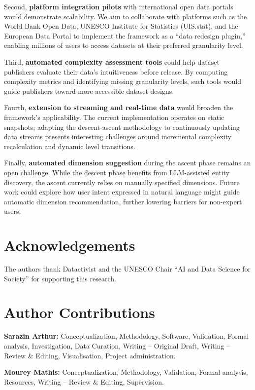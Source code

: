 \documentclass[12pt,a4paper]{article}
\begin{document}
Second, \textbf{platform integration pilots} with international open data portals would demonstrate scalability. We aim to collaborate with platforms such as the World Bank Open Data, UNESCO Institute for Statistics (UIS.stat), and the European Data Portal to implement the framework as a ``data redesign plugin,'' enabling millions of users to access datasets at their preferred granularity level.

Third, \textbf{automated complexity assessment tools} could help dataset publishers evaluate their data's intuitiveness before release. By computing complexity metrics and identifying missing granularity levels, such tools would guide publishers toward more accessible dataset designs.

Fourth, \textbf{extension to streaming and real-time data} would broaden the framework's applicability. The current implementation operates on static snapshots; adapting the descent-ascent methodology to continuously updating data streams presents interesting challenges around incremental complexity recalculation and dynamic level transitions.

Finally, \textbf{automated dimension suggestion} during the ascent phase remains an open challenge. While the descent phase benefits from LLM-assisted entity discovery, the ascent currently relies on manually specified dimensions. Future work could explore how user intent expressed in natural language might guide automatic dimension recommendation, further lowering barriers for non-expert users.

\section*{Acknowledgements}
The authors thank Datactivist and the UNESCO Chair ``AI and Data Science for Society'' for supporting this research.

\section*{Author Contributions}
\textbf{Sarazin Arthur:} Conceptualization, Methodology, Software, Validation, Formal analysis, Investigation, Data Curation, Writing – Original Draft, Writing – Review \& Editing, Visualisation, Project administration.

\textbf{Mourey Mathis:} Conceptualization, Methodology, Validation, Formal analysis, Resources, Writing – Review \& Editing, Supervision.
\end{document}
